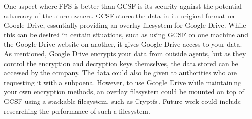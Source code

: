 One aspect where \gls{FFS} is better than \gls{GCSF} is its security against the potential adversary of the store owners. \gls{GCSF} stores the data in its original format on Google Drive, essentially providing an overlay filesystem for Google Drive. While this can be desired in certain situations, such as using \gls{GCSF} on one machine and the Google Drive website on another, it gives Google Drive access to your data. As mentioned, Google Drive encrypts your data from outside agents, but as they control the encryption and decryption keys themselves, the data stored can be accessed by the company. The data could also be given to authorities who are requesting it with a subpoena. However, to use Google Drive while maintaining your own encryption methods, an overlay filesystem could be mounted on top of \gls{GCSF} using a stackable filesystem, such as Cryptfs\,\cite{zadokCryptfsStackableVnode1998}. Future work could include researching the performance of such a filesystem.

